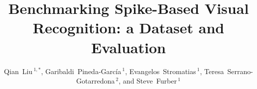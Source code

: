 \documentclass{frontiersENG} %
\def\firstAuthorLast{Qian Liu {et~al.}} %
\def\Authors{Qian~Liu\,$^{1,*}$, Garibaldi~Pineda-Garc\'ia\,$^{1}$, Evangelos~Stromatias\,$^{1}$, Teresa~Serrano-Gotarredona\,$^{2}$, and Steve~Furber\,$^{1}$}
\begin{document}
\onecolumn
{}

\title[Benchmarking Spike-Based Visual Recognition: a Dataset and Evaluation]{Benchmarking  Spike-Based Visual Recognition: a Dataset and Evaluation}
\author[\firstAuthorLast ]{\Authors}
\address{}
\correspondance{}
\extraAuth{}%
\topic{}

\maketitle
\begin{abstract}


\end{abstract}
\end{document}
